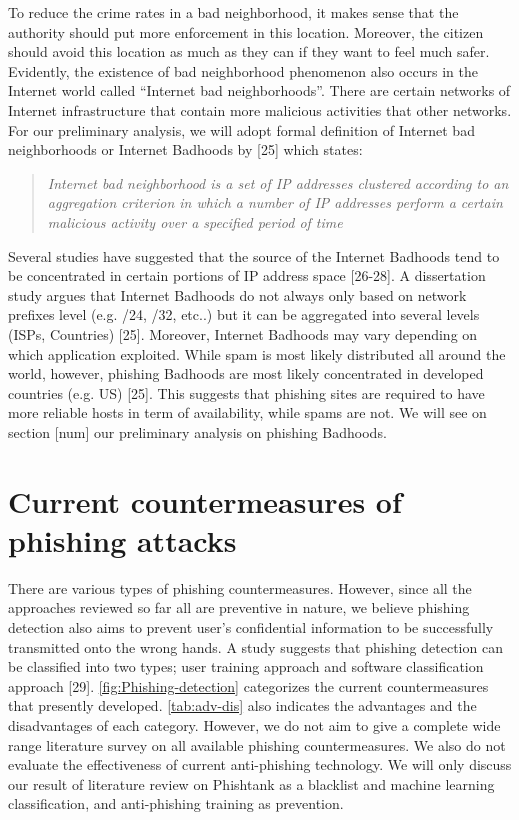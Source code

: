 To reduce the crime rates in a bad neighborhood, it makes sense that
the authority should put more enforcement in this location. Moreover,
the citizen should avoid this location as much as they can if they
want to feel much safer. Evidently, the existence of bad neighborhood
phenomenon also occurs in the Internet world called ``Internet bad
neighborhoods''. There are certain networks of Internet infrastructure
that contain more malicious activities that other networks. For our
preliminary analysis, we will adopt formal definition of Internet
bad neighborhoods or Internet Badhoods by {[}25{]} which states: 
\begin{quote}
\textit{Internet bad neighborhood is a set of IP addresses clustered
according to an aggregation criterion in which a number of IP addresses
perform a certain malicious activity over a specified period of time}
\end{quote}
Several studies have suggested that the source of the Internet Badhoods
tend to be concentrated in certain portions of IP address space {[}26-28{]}.
A dissertation study argues that Internet Badhoods do not always only
based on network prefixes level (e.g. /24, /32, etc..) but it can
be aggregated into several levels (ISPs, Countries) {[}25{]}. Moreover,
Internet Badhoods may vary depending on which application exploited.
While spam is most likely distributed all around the world, however,
phishing Badhoods are most likely concentrated in developed countries
(e.g. US) {[}25{]}. This suggests that phishing sites are required
to have more reliable hosts in term of availability, while spams are
not. We will see on section {[}num{]} our preliminary analysis on
phishing Badhoods.


\section{Current countermeasures of phishing attacks}

There are various types of phishing countermeasures. However, since
all the approaches reviewed so far all are preventive in nature, we
believe phishing detection also aims to prevent user\textquoteright s
confidential information to be successfully transmitted onto the wrong
hands. A study suggests that phishing detection can be classified
into two types; user training approach and software classification
approach {[}29{]}. \autoref{fig:Phishing-detection} categorizes the
current countermeasures that presently developed. \autoref{tab:adv-dis}
also indicates the advantages and the disadvantages of each category\citep{parmar:2014}.
However, we do not aim to give a complete wide range literature survey
on all available phishing countermeasures. We also do not evaluate
the effectiveness of current anti-phishing technology. We will only
discuss our result of literature review on Phishtank as a blacklist
and machine learning classification, and anti-phishing training as
prevention.

